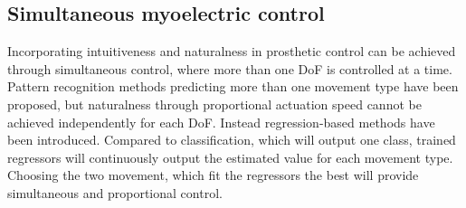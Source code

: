 \subsection{Simultaneous myoelectric control}

Incorporating intuitiveness and naturalness in prosthetic control can be achieved through simultaneous control, where more than one DoF is controlled at a time. Pattern recognition methods predicting more than one movement type have been proposed, but naturalness through proportional actuation speed cannot be achieved independently for each DoF. Instead regression-based methods have been introduced. Compared to classification, which will output one class, trained regressors will continuously output the estimated value for each movement type. Choosing the two movement, which fit the regressors the best will provide simultaneous and proportional control. \cite{Hahne2014} 

